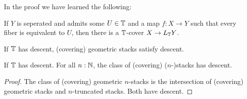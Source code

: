In the proof we have learned the following:
\begin{lemma}{\label{lemma:stackificationHasTCover}}
	If $Y$ is seperated and admits some $U \in \mathbb{T}$ and a map $f : X \to Y$ such that every fiber is equivalent to $U$, then there is a $\mathbb{T}$-cover $X \to L_{\mathbb{T}} Y$.
\end{lemma}
\begin{corollary}
	If $\mathbb{T}$ has descent, (covering) geometric stacks satisfy descent.
\end{corollary}

\begin{corollary}
	If $\mathbb{T}$ has descent. For all $n : \mathbb{N} $, the class of (covering) ($n$-)stacks has descent.
\end{corollary}
\begin{proof}
	The class of (covering) geometric $n$-stacks is the intersection of (covering) geometric stacks and $n$-truncated stacks. Both have descent.
\end{proof}

